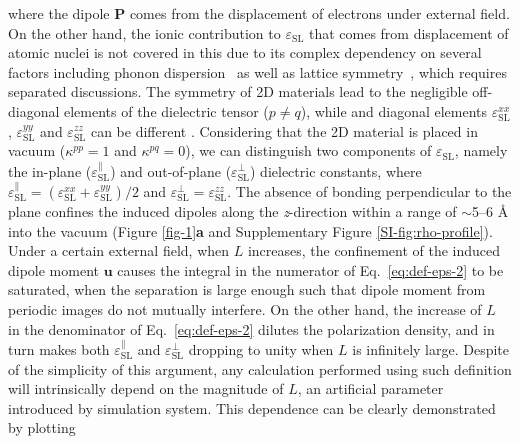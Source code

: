 \documentclass[journal=ancac3,manuscript=article,email=true,hyperref=true,keywords=false]{achemso}
\begin{document}
where the dipole $\boldsymbol{P}$ comes from the displacement of
electrons under external field.  On the other hand, the ionic
contribution to $\varepsilon_{\mathrm{SL}}$ that comes from
displacement of atomic nuclei is not covered in this due to its
complex dependency on several factors including phonon
dispersion~\cite{Sohier_2017} as well as lattice
symmetry~\cite{Laturia_2018}, which requires separated discussions.
The symmetry of 2D materials lead to the negligible off-diagonal
elements of the dielectric tensor ($p \neq q$), while and diagonal
elements $\varepsilon_{\mathrm{SL}}^{xx}$,
$\varepsilon_{\mathrm{SL}}^{yy}$ and $\varepsilon_{\mathrm{SL}}^{zz}$
can be different \cite{Sohier_2016}.  Considering that the 2D material
is placed in vacuum ($\kappa^{pp} = 1$ and $\kappa^{pq} = 0$), we can
distinguish two components of $\varepsilon_{\mathrm{SL}}$, namely the
in-plane ($\varepsilon_{\mathrm{SL}}^{\parallel}$) and out-of-plane
($\varepsilon_{\mathrm{SL}}^{\perp}$) dielectric constants, where
$\varepsilon_{\mathrm{SL}}^{\parallel} =
(\varepsilon_{\mathrm{SL}}^{xx} + \varepsilon_{\mathrm{SL}}^{yy})/2$
and
$\varepsilon_{\mathrm{SL}}^{\perp} = \varepsilon_{\mathrm{SL}}^{zz}$.
The absence of bonding perpendicular to the plane confines the induced
dipoles along the \textit{z}-direction within a range of $\sim{}$5--6
\AA{} into the vacuum (Figure \ref{fig-1}{\textbf a} and Supplementary
Figure \ref{SI-fig:rho-profile}).
%
%
Under a certain external field, when $L$ increases, the confinement of
the induced dipole moment $\boldsymbol{u}$ causes the integral in the
numerator of Eq.~\ref{eq:def-eps-2} to be saturated, when the
separation is large enough such that dipole moment from periodic
images do not mutually interfere. On the other hand, the increase of
$L$ in the denominator of Eq.~\ref{eq:def-eps-2} dilutes the polarization density, and in turn makes both
$\varepsilon^{\parallel}_{\mathrm{SL}}$ and
$\varepsilon^{\perp}_{\mathrm{SL}}$ dropping to
unity when $L$ is infinitely large.
%
%
%
Despite of the simplicity of this argument, any calculation performed
using such definition will intrinsically depend on the magnitude of
$L$, an artificial parameter introduced by simulation system. This
dependence can be clearly demonstrated by plotting
\end{document}
